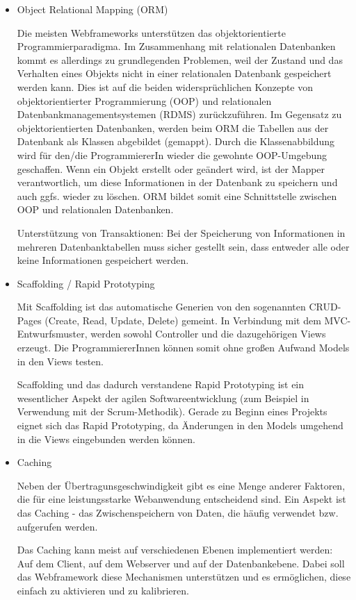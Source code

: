 \documentclass[
11pt, %
a4paper, %
BCOR25mm, %
DIV14, %
footsepline = false, %
headsepline, %
twoside, %
openright,
abstracton, %
listof=totocnumbered, %
bibliography=totocnumbered %
]{scrreprt}
\begin{document}
\begin{itemize}
  \item Object Relational Mapping (ORM)

Die meisten Webframeworks unterstützen das objektorientierte
Programmierparadigma. Im Zusammenhang mit relationalen Datenbanken kommt es
allerdings zu grundlegenden Problemen, weil der Zustand und das Verhalten eines
Objekts nicht in einer relationalen Datenbank gespeichert werden kann. Dies ist
auf die beiden widersprüchlichen Konzepte von objektorientierter Programmierung
(OOP) und relationalen Datenbankmanagementsystemen (RDMS) zurückzuführen. Im
Gegensatz zu objektorientierten Datenbanken, werden beim ORM die Tabellen aus
der Datenbank als Klassen abgebildet (gemappt). Durch die Klassenabbildung wird
für den/die ProgrammiererIn wieder die gewohnte OOP-Umgebung geschaffen. Wenn
ein Objekt erstellt oder geändert wird, ist der Mapper verantwortlich, um diese
Informationen in der Datenbank zu speichern und auch ggfs. wieder zu löschen.
ORM bildet somit eine Schnittstelle zwischen OOP und relationalen Datenbanken.

Unterstützung von Transaktionen: Bei der Speicherung von Informationen in
mehreren Datenbanktabellen muss sicher gestellt sein, dass entweder alle oder
keine Informationen gespeichert werden.

  \item Scaffolding / Rapid Prototyping

Mit Scaffolding ist das automatische Generien von den sogenannten CRUD-Pages
(Create, Read, Update, Delete) gemeint. In Verbindung mit dem
MVC-Entwurfsmuster, werden sowohl Controller und die dazugehörigen Views
erzeugt. Die ProgrammiererInnen können somit ohne großen Aufwand Models in den
Views testen.

Scaffolding und das dadurch verstandene Rapid Prototyping ist ein wesentlicher
Aspekt der agilen Softwareentwicklung (zum Beispiel in Verwendung mit der
Scrum-Methodik). Gerade zu Beginn eines Projekts eignet sich das Rapid
Prototyping, da Änderungen in den Models umgehend in die Views eingebunden
werden können.

  \item Caching

Neben der Übertragunsgeschwindigkeit gibt es eine Menge anderer Faktoren, die
für eine leistungsstarke Webanwendung entscheidend sind. Ein Aspekt ist das
Caching - das Zwischenspeichern von Daten, die häufig verwendet bzw. aufgerufen
werden.

Das Caching kann meist auf verschiedenen Ebenen implementiert werden: Auf dem
Client, auf dem Webserver und auf der Datenbankebene. Dabei soll das
Webframework diese Mechanismen unterstützen und es ermöglichen, diese einfach
zu aktivieren und zu kalibrieren.  


\end{itemize}
\end{document}

